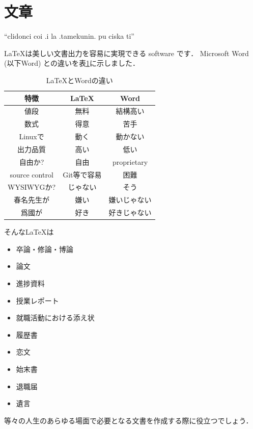 \section{文章}
  ``clidonci coi .i la .tamekunin. pu ciska ti''
  \par \LaTeX は美しい文書出力を容易に実現できる software です．
  Microsoft Word (以下Word) との違いを表\ref{tbl_latexVsWord}に示しました．
    \begin{table}[b]
      \center
      \caption{\LaTeX とWordの違い} \label{tbl_latexVsWord}
      \begin{tabular}{c||c|c}
        特徴 & \LaTeX & Word \\ \hline
        値段 & 無料 & 結構高い \\
        数式 & 得意 & 苦手 \\
        Linuxで & 動く & 動かない \\
        出力品質 & 高い & 低い \\
        自由か? & 自由 & proprietary \\
        source control & Git等で容易 & 困難 \\
        WYSIWYGか? & じゃない & そう \\
        春名先生が & 嫌い & 嫌いじゃない \\
        爲國が & 好き & 好きじゃない
      \end{tabular}
    \end{table}
  そんな\LaTeX は
    \begin{itemize}
      \item 卒論・修論・博論
      \item 論文
      \item 進捗資料
      \item 授業レポート
      \item 就職活動における添え状
      \item 履歴書
      \item 恋文
      \item 始末書
      \item 退職届
      \item 遺言
    \end{itemize}
  等々の人生のあらゆる場面で必要となる文書を作成する際に役立つでしょう．

